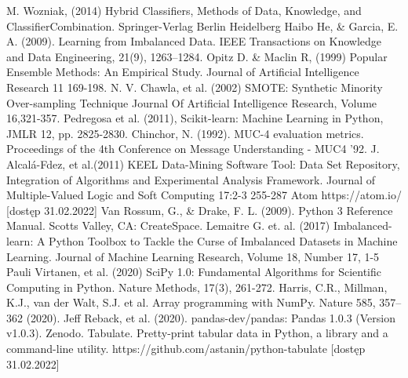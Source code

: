 \documentclass[a4paper,12pt]{article}
\begin{document}
\begin{thebibliography}{99}
M. Wozniak, (2014) Hybrid  Classifiers,  Methods  of  Data,  Knowledge,  and  ClassifierCombination. Springer-Verlag Berlin Heidelberg 
Haibo He, \& Garcia, E. A. (2009). Learning from Imbalanced Data. IEEE Transactions on Knowledge and Data Engineering, 21(9), 1263–1284.
Opitz D. \& Maclin R, (1999) Popular Ensemble Methods: An Empirical Study. Journal of Artificial Intelligence Research 11  169-198.
N. V. Chawla, et al. (2002) SMOTE: Synthetic Minority Over-sampling Technique Journal Of Artificial Intelligence Research, Volume 16,321-357.
Pedregosa et al. (2011), Scikit-learn: Machine Learning in Python, JMLR 12, pp. 2825-2830.
Chinchor, N. (1992). MUC-4 evaluation metrics. Proceedings of the 4th Conference on Message Understanding - MUC4 ’92.
J. Alcalá-Fdez, et al.(2011) KEEL Data-Mining Software Tool: Data Set Repository, Integration of Algorithms and Experimental Analysis Framework. Journal of Multiple-Valued Logic and Soft Computing 17:2-3  255-287
Atom https://atom.io/ [dostęp 31.02.2022]
Van Rossum, G., \& Drake, F. L. (2009). Python 3 Reference Manual. Scotts Valley, CA: CreateSpace.
Lemaitre G. et. al. (2017) Imbalanced-learn: A Python Toolbox to Tackle the Curse of Imbalanced Datasets in Machine Learning. Journal of Machine Learning Research, Volume 18, Number 17, 1-5
Pauli Virtanen, et al. (2020) SciPy 1.0: Fundamental Algorithms for Scientific Computing in Python. Nature Methods, 17(3), 261-272.
Harris, C.R., Millman, K.J., van der Walt, S.J. et al. Array programming with NumPy. Nature 585, 357–362 (2020). 
Jeff Reback, et al. (2020). pandas-dev/pandas: Pandas 1.0.3 (Version v1.0.3). Zenodo.
Tabulate. Pretty-print tabular data in Python, a library and a command-line utility. https://github.com/astanin/python-tabulate [dostęp 31.02.2022]
\end{thebibliography}
\end{document}
